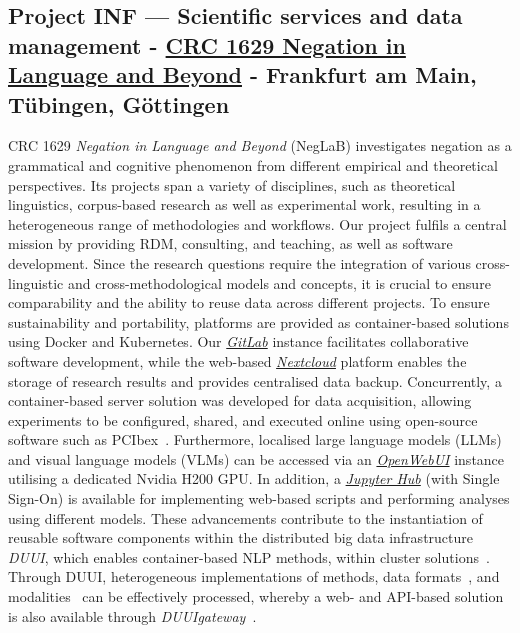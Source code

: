 \documentclass{eceasst}
\begin{document}
\subsection{Project INF --- Scientific services and data management - \href{https://gepris.dfg.de/gepris/projekt/537324246?language=en}{CRC 1629 Negation in Language and Beyond} - Frankfurt am Main, Tübingen, Göttingen}
CRC 1629 \textit{Negation in Language and Beyond} (NegLaB) investigates negation as a grammatical and cognitive phenomenon from different empirical and theoretical perspectives. 
Its projects span a variety of disciplines, such as theoretical linguistics, corpus-based research as well as experimental work, resulting in a heterogeneous range of methodologies and workflows.
Our project fulfils a central mission by providing RDM, consulting, and teaching, as well as software development.
Since the research questions require the integration of various cross-linguistic and cross-methodological models and concepts, it is crucial to ensure comparability and the ability to reuse data across different projects.
To ensure sustainability and portability, platforms are provided as container-based solutions using Docker and Kubernetes.
Our \href{https://about.gitlab.com/}{\textit{GitLab}} instance facilitates collaborative software development, while the web-based \href{https://nextcloud.com}{\textit{Nextcloud}} platform enables the storage of research results and provides centralised data backup.
Concurrently, a container-based server solution was developed for data acquisition, allowing experiments to be configured, shared, and executed online using open-source software such as PCIbex~\cite{Zehr:Schwarz:2018}.
Furthermore, localised large language models (LLMs) and visual language models (VLMs) can be accessed via an \href{https://openwebui.com/}{\textit{OpenWebUI}} instance utilising a dedicated Nvidia H200 GPU.
In addition, a \href{https://jupyter.org/hub}{\textit{Jupyter Hub}} (with Single Sign-On) is available for implementing web-based scripts and performing analyses using different models.
These advancements contribute to the instantiation of reusable software components within the distributed big data infrastructure \textit{DUUI}, which enables container-based NLP methods, within cluster solutions~\cite{Abrami:et:al:2025:a}.
Through DUUI, heterogeneous implementations of methods, data formats~\cite{Hammerla:et:al:2025a}, and modalities~\cite{Bundan:Abrami:Mehler:2025} can be effectively processed, whereby a web- and API-based solution is also available through \textit{DUUIgateway}~\cite{Borkowski:et:al:2026}.
\end{document}
